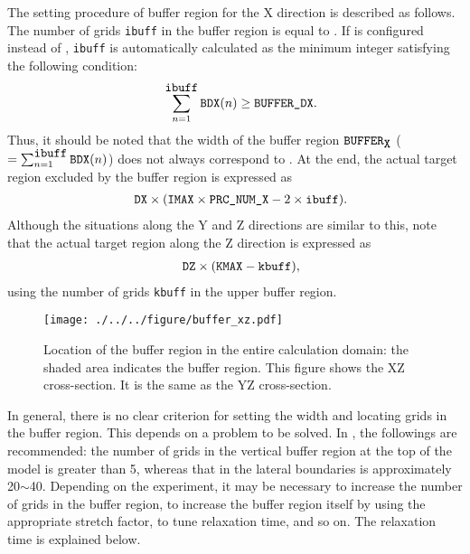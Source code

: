 The setting procedure of buffer region for the X direction is described as follows.
The number of grids \verb|ibuff| in the buffer region is equal to .
If  is configured instead of , \verb|ibuff| is automatically calculated as the minimum integer satisfying the following condition:
%
\begin{eqnarray}
   && \sum_{n=1}^{\verb|ibuff|} \verb|BDX|(n) \ge \nmitemeq{BUFFER_DX}. \nonumber
\end{eqnarray}
%
Thus, it should be noted that the width of the buffer region $\verb|BUFFER|_{\verb|X|}$ ($= \sum_{n=1}^{\verb|ibuff|} \verb|BDX|(n)$) does not always correspond to . At the end, the actual target region excluded by the buffer region is expressed as
%
\begin{eqnarray}
   && \nmitemeq{DX} \times ( \nmitemeq{IMAX} \times \nmitemeq{PRC_NUM_X} - 2 \times \verb|ibuff| ).
\end{eqnarray}
%
Although the situations along the Y and Z directions are similar to this, note that the actual target region along the Z direction is expressed as
%
\begin{eqnarray}
   && \nmitemeq{DZ} \times ( \nmitemeq{KMAX} - \verb|kbuff| ),
\end{eqnarray}
%
using the number of grids \verb|kbuff| in the upper buffer region.

\begin{figure}[t]
\begin{center}
  \texttt{[image: ./../../figure/buffer\_xz.pdf]}\\
  \caption{Location of the buffer region in the entire calculation domain: the shaded area indicates the buffer region. This figure shows the XZ cross-section. It is the same as the YZ cross-section.}
  \label{fig:buff_xz}
\end{center}
\end{figure}

In general, there is no clear criterion for setting the width and locating grids in the buffer region.
This depends on a problem to be solved.
In \scalerm, the followings are recommended: the number of grids in the vertical buffer region at the top of the model is greater than 5, whereas that in the lateral boundaries is approximately 20$\sim$40.
Depending on the experiment, it may be necessary to increase the number of grids in the buffer region, to increase the buffer region itself by using the appropriate stretch factor, to tune relaxation time, and so on.
The relaxation time is explained below.




